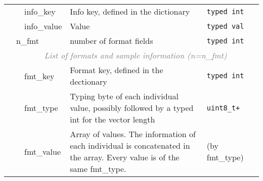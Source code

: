 \documentclass[10pt]{article}
\begin{document}
\begin{table}[ht]
{\begin{tabular}{|l|l|l|p{8.2cm}|l|r|}
  & & {\sf info\_key} & Info key, defined in the dictionary & {\tt typed int} & \\\cline{3-6}
  & & {\sf info\_value} & Value & {\tt typed val} &\\
  \cline{2-6}
  & \multicolumn{2}{l|}{\sf n\_fmt} & number of format fields & {\tt typed int} & \\\cline{2-6}
  & \multicolumn{5}{c|}{\textcolor{gray}{\it List of formats and sample information (n=n\_fmt)}} \\\cline{3-6}
  & & {\sf fmt\_key} & Format key, defined in the dectionary & {\tt typed int} & \\\cline{3-6}
  & & {\sf fmt\_type} & Typing byte of each individual value, possibly followed by a typed int for the vector length & {\tt uint8\_t+} & \\\cline{3-6}
  & & {\sf fmt\_value} & Array of values. The information of each individual is concatenated in the array. Every value is of the same {\sf fmt\_type}. & (by {\sf fmt\_type}) &\\
  \cline{1-6}
\end{tabular}}
\end{table}
\end{document}
